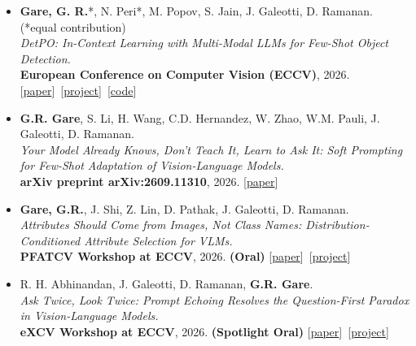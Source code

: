 \documentclass[10pt,a4paper,ragged2e,withhyper]{altacv}
\newcommand{\publink}[2]{{\small[\href{#1}{#2}]}}
\renewcommand{\cvsection}[2][]{\needspace{6\baselineskip}\origcvsection[#1]{#2}}
\renewcommand{\cvevent}[4]{\needspace{8\baselineskip}\origcvevent{#1}{#2}{#3}{#4}}
\begin{document}



\cvsection{Selected Publications}

\begin{itemize}
\item \textbf{Gare, G. R.}*, N. Peri*, M. Popov, S. Jain, J. Galeotti, D. Ramanan. (*equal contribution)\\
\emph{DetPO: In-Context Learning with Multi-Modal LLMs for Few-Shot Object Detection.}\\
\textbf{European Conference on Computer Vision (ECCV)}, 2026.
\publink{https://arxiv.org/abs/2603.23455}{paper}~\publink{https://ggare-cmu.github.io/DetPO/}{project}~\publink{https://github.com/ggare-cmu/DetPO}{code}
\divider

\item \textbf{G.R. Gare}, S. Li, H. Wang, C.D. Hernandez, W. Zhao, W.M. Pauli, J. Galeotti, D. Ramanan.\\
\emph{Your Model Already Knows, Don't Teach It, Learn to Ask It: Soft Prompting for Few-Shot Adaptation of Vision-Language Models.}\\
\textbf{arXiv preprint arXiv:2609.11310}, 2026.
\publink{https://arxiv.org/abs/2609.11310}{paper}
\divider

\item \textbf{Gare, G.R.}, J. Shi, Z. Lin, D. Pathak, J. Galeotti, D. Ramanan.\\
\emph{Attributes Should Come from Images, Not Class Names: Distribution-Conditioned Attribute Selection for VLMs.}\\
\textbf{PFATCV Workshop at ECCV}, 2026. \textbf{(Oral)}
\publink{https://arxiv.org/abs/2607.18695}{paper}~\publink{https://ggare-cmu.github.io/AttributeSelect/}{project}
\divider

\item R. H. Abhinandan, J. Galeotti, D. Ramanan, \textbf{G.R. Gare}.\\
\emph{Ask Twice, Look Twice: Prompt Echoing Resolves the Question-First Paradox in Vision-Language Models.}\\
\textbf{eXCV Workshop at ECCV}, 2026. \textbf{(Spotlight Oral)}
\publink{https://arxiv.org/abs/2607.15565}{paper}~\publink{https://rakshanda-cmu.github.io/ask-twice-look-twice/}{project}
\divider


\end{itemize}
\end{document}
